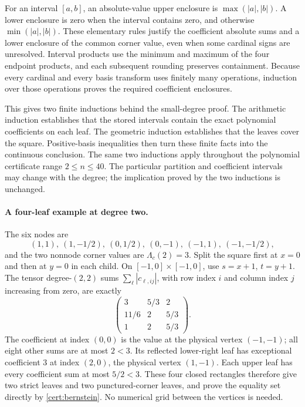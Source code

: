For an interval $[a,b]$, an absolute-value upper enclosure is
$\max(|a|,|b|)$. A lower enclosure is zero when the interval contains
zero, and otherwise $\min(|a|,|b|)$. These elementary rules justify the
coefficient absolute sums and a lower enclosure of the common corner
value, even when some cardinal signs are unresolved. Interval products
use the minimum and maximum of the four endpoint products, and each
subsequent rounding preserves containment. Because every cardinal and
every basis transform uses finitely many operations, induction over
those operations proves the required coefficient enclosures.

This gives two finite inductions behind the small-degree proof. The
arithmetic induction establishes that the stored intervals contain the
exact polynomial coefficients on each leaf. The geometric induction
establishes that the leaves cover the square. Positive-basis inequalities
then turn these finite facts into the continuous conclusion. The
same two inductions apply throughout the polynomial certificate range
$2\leq n\leq40$. The particular partition and coefficient intervals
may change with the degree; the implication proved by the two inductions
is unchanged.

\paragraph{A four-leaf example at degree two.}
The six nodes are
\[
 (1,1),\ (1,-1/2),\ (0,1/2),\ (0,-1),\ (-1,1),\ (-1,-1/2),
\]
and the two nonnode corner values are $\Lambda_c(2)=3$.
Split the square first at $x=0$ and then at $y=0$ in each child.
On $[-1,0]\times[-1,0]$, use $s=x+1$, $t=y+1$.
The tensor degree-$(2,2)$ sums $\sum_\ell|c_{\ell,ij}|$, with
row index $i$ and column index $j$ increasing from zero, are exactly
\[
 \begin{pmatrix}
 3&5/3&2\\
 11/6&2&5/3\\
 1&2&5/3
 \end{pmatrix}.
\]
The coefficient at index $(0,0)$ is the value at the physical vertex
$(-1,-1)$; all eight other sums are at most $2<3$.
Its reflected lower-right leaf has exceptional coefficient $3$ at
index $(2,0)$, the physical vertex $(1,-1)$.
Each upper leaf has every coefficient sum at most $5/2<3$.
These four closed rectangles therefore give two strict leaves and two
punctured-corner leaves, and prove the equality set directly by
\eqref{cert:bernstein}. No numerical grid between the vertices is needed.

